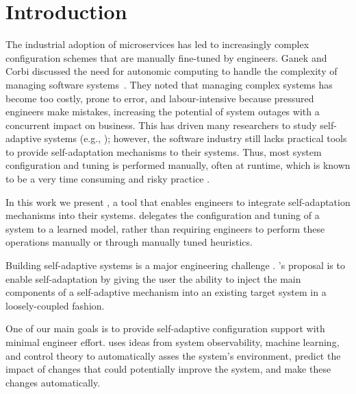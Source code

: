 
\section{Introduction}

The industrial adoption of microservices has led to increasingly complex configuration schemes that are manually fine-tuned by engineers. Ganek and Corbi discussed the need for autonomic computing to handle the complexity of managing software systems~\cite{ganek_dawning_2003}. They noted that managing complex systems has become too costly, prone to error, and labour-intensive because pressured engineers make mistakes, increasing the potential of system outages with a concurrent impact on business. This has driven many researchers to study self-adaptive systems (e.g., \cite{porter_rex:_2016, andrew_pavlo_self-driving_2017, salehie_self-adaptive_2009, ganapathi_predicting_2009, herbst_self-adaptive_2014, faniyi_architecting_2014}); however, the software industry still lacks practical tools to provide self-adaptation mechanisms to their systems. Thus, most system configuration and tuning is performed manually, often at runtime, which is known to be a very time consuming and risky practice \cite{ganek_dawning_2003, using_prob_reasoning_automate_software_tuning, de_lemos_software_2013}.

In this work we present \projectname{}, a tool that enables engineers to integrate self-adaptation mechanisms into their systems. \projectname{} delegates the configuration and tuning of a system to a learned model, rather than requiring engineers to perform these operations manually or through manually tuned heuristics.

Building self-adaptive systems is a major engineering challenge \cite{brun_engineering_2009}. \projectname{}'s proposal is to enable self-adaptation by giving the user the ability to inject the main components of a self-adaptive mechanism into an existing target system in a loosely-coupled fashion.

One of our main goals is to provide self-adaptive configuration support with minimal engineer effort. \projectname{} uses ideas from system observability, machine learning, and control theory to automatically asses the system's environment, predict the impact of changes that could potentially improve the system, and make these changes automatically.


